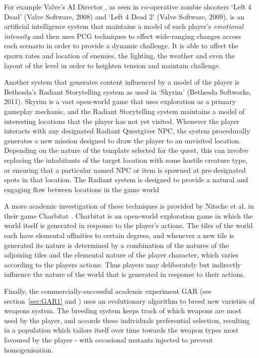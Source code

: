 \documentclass{acm_proc_article-sp}
\begin{document}
For example Valve's AI Director \cite{valve}, as seen in co-operative zombie shooters `Left 4 Dead' (Valve Software, 2008) and `Left 4 Dead 2' (Valve Software, 2009), is an artificial intelligence system that maintains a model of each player's \textit{emotional intensity} and then uses PCG techniques to effect wide-ranging changes across each scenario in order to provide a dynamic challenge. It is able to affect the spawn rates and location of enemies, the lighting, the weather and even the layout of the level in order to heighten tension and maintain challenge.

Another system that generates content influenced by a model of the player is Bethesda's Radiant Storytelling system \cite{radiant} as used in `Skyrim' (Bethesda Softworks, 2011). Skyrim is a vast open-world game that uses exploration as a primary gameplay mechanic, and the Radiant Storytelling system maintains a model of interesting locations that the player has not yet visited. Whenever the player interacts with any designated Radiant Questgiver NPC, the system procedurally generates a new mission designed to draw the player to an unvisited location. Depending on the nature of the template selected for the quest, this can involve replacing the inhabitants of the target location with some hostile creature type, or ensuring that a particular named NPC or item is spawned at pre-designated spots in that location. The Radiant system is designed to provide a natural and engaging flow between locations in the game world

A more academic investigation of these techniques is provided by Nitsche et al. in their game Charbitat \cite{charbitat}. Charbitat is an open-world exploration game in which the world itself is generated in response to the player's actions. The tiles of the world each have elemental affinities to certain degrees, and whenever a new tile is generated its nature is determined by a combination of the natures of the adjoining tiles and the elemental nature of the player character, which varies according to the players actions. Thus players may deliberately but indirectly influence the nature of the world that is generated in response to their actions.

\newpage
\label{sec:GAR2}
Finally, the commercially-successful academic experiment GAR (see section~\ref{sec:GAR1} and \cite{garmsr}) uses an evolutionary algorithm to breed new varieties of weapons system. The breeding system keeps track of which weapons are most used by the player, and accords these individuals preferential selection, resulting in a population which tailors itself over time towards the weapon types most favoured by the player - with occasional mutants injected to prevent homogenisation.
\end{document}
